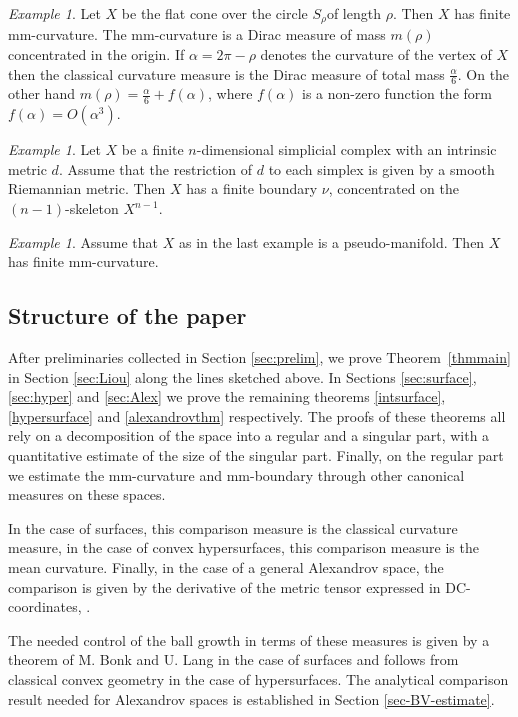\documentclass[12pt,leqno,intlimits]{amsart}
\numberwithin{equation}{section}
\theoremstyle{definition}
\theoremstyle{remark}
\newtheorem{ex}[thm]{Example}
\newcommand{\tref}[1]{Theorem~\ref{#1}}
\begin{document}
\begin{ex} \label{ex:cone}
Let $X$ be the flat cone over the circle $S_{\rho}$of length $\rho$.
Then $X$ has finite mm-curvature. The mm-curvature is a Dirac measure of mass $m(\rho)$ concentrated in the origin.
If $\alpha =2\pi-\rho$ denotes the curvature of the vertex of $X$ then the classical curvature measure is the Dirac measure of total mass
$\frac \alpha 6$.  On the other hand $m(\rho)= \frac \alpha 6 + f(\alpha)$, where
$f(\alpha)$ is a non-zero function the form $f(\alpha)= O(\alpha ^3)$.
\end{ex}



\begin{ex}  \label{ex:secondlast}
Let $X$ be a finite $n$-dimensional simplicial complex with an intrinsic metric $d$.
Assume that the restriction of $d$ to each simplex is given by a smooth Riemannian metric.
Then $X$ has a finite boundary $\nu$, concentrated on  the $(n-1)$-skeleton $X^{n-1}$.
\end{ex}

\begin{ex}  \label{ex:last}
Assume that $X$   as in the last example   is a pseudo-manifold.
Then $X$ has finite mm-curvature.
\end{ex}

\subsection{Structure of the paper}
After preliminaries collected in Section \ref{sec:prelim}, we prove \tref{thmmain} in Section \ref{sec:Liou} along the lines sketched above.
In Sections \ref{sec:surface}, \ref{sec:hyper}  and \ref{sec:Alex} we prove  the remaining theorems \ref{intsurface}, \ref{hypersurface} and \ref{alexandrovthm} respectively.
The proofs of these theorems all rely on a decomposition of the space into a regular and a singular part, with a quantitative estimate of the size of the singular part.
Finally, on the regular part we estimate the mm-curvature and mm-boundary through other
canonical measures  on these spaces.

In the case of surfaces, this comparison measure is the classical curvature measure, in the case of convex hypersurfaces, this comparison measure is the mean curvature. 
Finally, in the case of a general  Alexandrov space, the comparison is given by the derivative of the metric tensor  expressed in DC-coordinates, \cite{Per-DC}.

The needed control of the ball growth in terms of these measures is given by a theorem of M. Bonk  and U. Lang in the case of surfaces  and follows from classical convex geometry in the case of hypersurfaces.
The analytical comparison result  needed for Alexandrov spaces is established in Section \ref{sec-BV-estimate}.
\end{document}
